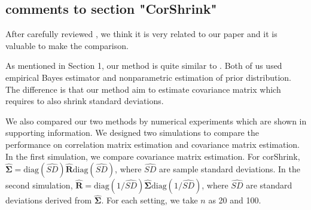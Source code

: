 \documentclass[12pt]{article}
\def\bs{\boldsymbol}
\begin{document}
\subsection{comments to section "CorShrink"}
After carefully reviewed \cite{dey2018}, we think it is very related to our paper and it is valuable to make the comparison.

As mentioned in Section 1, our method is quite similar to \cite{dey2018}. Both of us used empirical Bayes estimator and nonparametric estimation of prior distribution. The difference is that our method aim to estimate covariance matrix which requires to also shrink standard deviations.

We also compared our two methods by numerical experiments which are shown in supporting information. We designed two simulations to compare the performance on correlation matrix estimation and covariance matrix estimation. In the first simulation, we compare covariance matrix estimation. For corShrink, $\widehat{\bs{\Sigma}} = \text{diag}(\widehat{SD}) \widehat{\bs{R}} \text{diag}(\widehat{SD})$, where $\widehat{SD}$ are sample standard deviations. In the second simulation, $\bs{\widehat{R}} = \text{diag}(1/\widehat{SD})\widehat{\bs{\Sigma}}\text{diag}(1/\widehat{SD})$, where $\widehat{SD}$ are standard deviations derived from $\widehat{\bs{\Sigma}}$. For each setting, we take $n$ as 20 and 100. 
\end{document}
